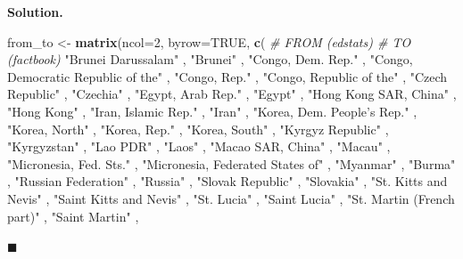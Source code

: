 \documentclass[10pt,b5paper,krantz1]{krantz}
\newenvironment{Shaded}{\begin{snugshade}}{\end{snugshade}}
\newcommand{\CommentTok}[1]{\textcolor[rgb]{0.37,0.37,0.37}{\textit{#1}}}
\newcommand{\DataTypeTok}[1]{\textcolor[rgb]{0.27,0.27,0.27}{#1}}
\newcommand{\DecValTok}[1]{\textcolor[rgb]{0.06,0.06,0.06}{#1}}
\newcommand{\KeywordTok}[1]{\textcolor[rgb]{0.27,0.27,0.27}{\textbf{#1}}}
\newcommand{\NormalTok}[1]{#1}
\newcommand{\OtherTok}[1]{\textcolor[rgb]{0.37,0.37,0.37}{#1}}
\newcommand{\StringTok}[1]{\textcolor[rgb]{0.5,0.5,0.5}{#1}}
\newenvironment{solution}{%
\bigskip\noindent\textbf{Solution. }%
\it\ignorespaces%
\ignorespaces%
}{\ignorespaces%
\hfill$\blacksquare$%
}
\begin{document}
\begin{solution}
\begin{Shaded}
\begin{Highlighting}[]
\NormalTok{from_to <-}\StringTok{ }\KeywordTok{matrix}\NormalTok{(}\DataTypeTok{ncol=}\DecValTok{2}\NormalTok{, }\DataTypeTok{byrow=}\OtherTok{TRUE}\NormalTok{, }\KeywordTok{c}\NormalTok{(}
\CommentTok{# FROM (edstats)                  # TO (factbook)}
\StringTok{"Brunei Darussalam"}\NormalTok{             , }\StringTok{"Brunei"}\NormalTok{                            ,}
\StringTok{"Congo, Dem. Rep."}\NormalTok{              , }\StringTok{"Congo, Democratic Republic of the"}\NormalTok{ ,}
\StringTok{"Congo, Rep."}\NormalTok{                   , }\StringTok{"Congo, Republic of the"}\NormalTok{            ,}
\StringTok{"Czech Republic"}\NormalTok{                , }\StringTok{"Czechia"}\NormalTok{                           ,}
\StringTok{"Egypt, Arab Rep."}\NormalTok{              , }\StringTok{"Egypt"}\NormalTok{                             ,}
\StringTok{"Hong Kong SAR, China"}\NormalTok{          , }\StringTok{"Hong Kong"}\NormalTok{                         ,}
\StringTok{"Iran, Islamic Rep."}\NormalTok{            , }\StringTok{"Iran"}\NormalTok{                              ,}
\StringTok{"Korea, Dem. People’s Rep."}\NormalTok{     , }\StringTok{"Korea, North"}\NormalTok{                      ,}
\StringTok{"Korea, Rep."}\NormalTok{                   , }\StringTok{"Korea, South"}\NormalTok{                      ,}
\StringTok{"Kyrgyz Republic"}\NormalTok{               , }\StringTok{"Kyrgyzstan"}\NormalTok{                        ,}
\StringTok{"Lao PDR"}\NormalTok{                       , }\StringTok{"Laos"}\NormalTok{                              ,}
\StringTok{"Macao SAR, China"}\NormalTok{              , }\StringTok{"Macau"}\NormalTok{                             ,}
\StringTok{"Micronesia, Fed. Sts."}\NormalTok{         , }\StringTok{"Micronesia, Federated States of"}\NormalTok{   ,}
\StringTok{"Myanmar"}\NormalTok{                       , }\StringTok{"Burma"}\NormalTok{                             ,}
\StringTok{"Russian Federation"}\NormalTok{            , }\StringTok{"Russia"}\NormalTok{                            ,}
\StringTok{"Slovak Republic"}\NormalTok{               , }\StringTok{"Slovakia"}\NormalTok{                          ,}
\StringTok{"St. Kitts and Nevis"}\NormalTok{           , }\StringTok{"Saint Kitts and Nevis"}\NormalTok{             ,}
\StringTok{"St. Lucia"}\NormalTok{                     , }\StringTok{"Saint Lucia"}\NormalTok{                       ,}
\StringTok{"St. Martin (French part)"}\NormalTok{      , }\StringTok{"Saint Martin"}\NormalTok{                      ,}

\end{Highlighting}
\end{Shaded}
\end{solution}
\end{document}
